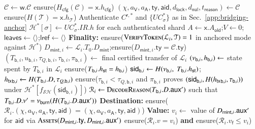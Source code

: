 \begin{algorithm}[!htbp]
\caption{Batch Return Relation $\mathfrak{R}(\mathsf{x},\mathsf{w})$}\label{alg:bridge-relation}
\begin{algorithmic}[0]
  \State $\mathcal{C} \gets \mathsf{w}.\mathcal{C}$
  \State ensure($H_\mathsf{cfg}(\mathcal{C}) = \mathsf{x}.h_\mathsf{cfg}$)
  \State $(\chi,a_\mathsf{V},a_\mathsf{A},\mathsf{ty},\mathsf{aid},d_\mathsf{lock},d_\mathsf{nul},t_\mathsf{reason}) \gets \mathcal{C}$
  \State ensure($H(\mathcal{T}) = \mathsf{x}.h_\mathcal{T}$)
  \State Authenticate $C^{\mathsf r,*}$ and $\{UC^*_\sigma\}$ as in Sec.~\ref{app:bridging-anchor}
  \State $\mathcal H^*[\sigma]\gets UC^*_\sigma.IR.h$ for each authenticated shard
  \State $A \gets \mathsf{x}.A_\mathsf{old}$;\quad $V \gets 0$;\quad $\mathsf{leaves} \gets \langle\rangle$;\quad $\mathsf{lref} \gets \langle\rangle$
    \State \textbf{Finality:} ensure($\Call{VerifyToken}{\mathcal{L}_i,\mathcal{T}} = 1$ in anchored mode against $\mathcal H^*$)
    \State $D_{\mathsf{mint},i} \gets \mathcal{L}_i.T_0.D_\mathsf{mint}$;\quad ensure($D_{\mathsf{mint},i}.\mathsf{ty} = \mathcal{C}.\mathsf{ty}$)
    \State $(T_{\mathsf{b},i},u_{\mathsf{b},i},\tau_{Q,\mathsf{b},i},\tau_{\mathsf{b},i},\pi_{\mathsf{b},i}) \gets$ final certified transfer of $\mathcal{L}_i$
    \State $(\nu_{\mathsf{b},i},h_{\mathsf{b},i}) \gets$ state spent by $T_{\mathsf{b},i}$ in $\mathcal{L}_i$
    \State ensure($T_{\mathsf{b},i}.{h_\mathsf{st}} = h_{\mathsf{b},i}$)
    \State $\mathsf{sid}_{\mathsf{b},i} \gets H(\nu_{\mathsf{b},i},\;T_{\mathsf{b},i}.{h_\mathsf{st}})$;\quad ${h_\mathsf{tx}}_{\mathsf{b},i} \gets H(T_{\mathsf{b},i}.D,\tau_{Q,\mathsf{b},i})$
    \State ensure($\tau_{\mathsf{b},i}<\tau_{Q,\mathsf{b},i}$ and $\pi_{\mathsf{b},i}$ proves $(\mathsf{sid}_{\mathsf{b},i},H({h_\mathsf{tx}}_{\mathsf{b},i},\tau_{\mathsf{b},i}))$ under $\mathcal H^*[f_{\mathcal{SH}}(\mathsf{sid}_{\mathsf b,i})]$)
    \State $\mathcal{R}_i \gets \Call{DecodeReason}{T_{\mathsf{b},i}.D.\auxd'}$ such that $T_{\mathsf{b},i}.D.\nu' = \nu_\mathsf{burn}(H(T_{\mathsf{b},i}.D.\mathsf{aux}'))$
    \State \textbf{Destination:} ensure($\mathcal{R}_i.(\chi,a_\mathsf{V},a_\mathsf{A},\mathsf{ty},\mathsf{aid}) = (\chi,a_\mathsf{V},a_\mathsf{A},\mathsf{ty},\mathsf{aid})$)
    \State \textbf{Value:} $v_i \gets$ value of $D_{\mathsf{mint},i}.\mathsf{aux}'$ for $\mathsf{aid}$ via $\Call{Assets}{D_{\mathsf{mint},i}.\mathsf{ty},D_{\mathsf{mint},i}.\auxd'}$
    \State ensure($\mathcal{R}_i.v = v_i$) \textbf{and} ensure($\mathcal{R}_i.v_\mathsf{f} \le v_i$)

\end{algorithmic}
\end{algorithm}
